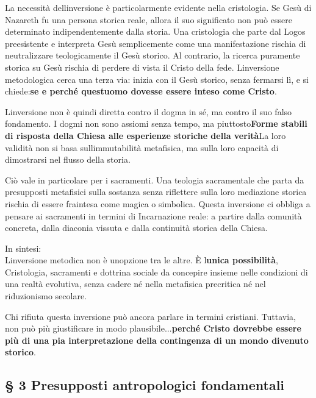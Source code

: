 \documentclass[
]{article}
\begin{document}
La necessità dell\textquotesingle inversione è particolarmente evidente nella cristologia. Se Gesù di Nazareth fu una persona storica reale, allora il suo significato non può essere determinato indipendentemente dalla storia. Una cristologia che parte dal Logos preesistente e interpreta Gesù semplicemente come una manifestazione rischia di neutralizzare teologicamente il Gesù storico. Al contrario, la ricerca puramente storica su Gesù rischia di perdere di vista il Cristo della fede. L\textquotesingle inversione metodologica cerca una terza via: inizia con il Gesù storico, senza fermarsi lì, e si chiede:\textbf{se e perché quest\textquotesingle uomo dovesse essere inteso come Cristo}.

L\textquotesingle inversione non è quindi diretta contro il dogma in sé, ma contro il suo falso fondamento. I dogmi non sono assiomi senza tempo, ma piuttosto\textbf{Forme stabili di risposta della Chiesa alle esperienze storiche della verità}La loro validità non si basa sull\textquotesingle immutabilità metafisica, ma sulla loro capacità di dimostrarsi nel flusso della storia.

Ciò vale in particolare per i sacramenti. Una teologia sacramentale che parta da presupposti metafisici sulla sostanza senza riflettere sulla loro mediazione storica rischia di essere fraintesa come magica o simbolica. Questa inversione ci obbliga a pensare ai sacramenti in termini di Incarnazione reale: a partire dalla comunità concreta, dalla diaconia vissuta e dalla continuità storica della Chiesa.

In sintesi:\\
L\textquotesingle inversione metodica non è un\textquotesingle opzione tra le altre. È l\textquotesingle{}\textbf{unica possibilità}, Cristologia, sacramenti e dottrina sociale da concepire insieme nelle condizioni di una realtà evolutiva, senza cadere né nella metafisica precritica né nel riduzionismo secolare.

Chi rifiuta questa inversione può ancora parlare in termini cristiani. Tuttavia, non può più giustificare in modo plausibile...\textbf{perché Cristo dovrebbe essere più di una pia interpretazione della contingenza di un mondo divenuto storico}.

\subsection{\texorpdfstring{\textbf{§ 3 Presupposti antropologici fondamentali}}{§ 3 Presupposti antropologici fondamentali}}\label{presupposti-antropologici-fondamentali}
\end{document}
